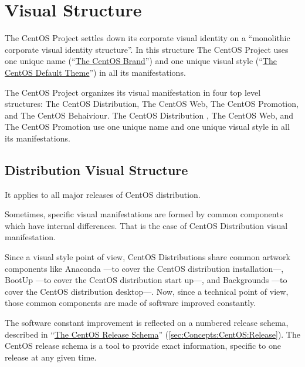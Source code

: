     \section{Visual Structure}
\hypertarget{sec:Concepts:Identity:Structure}{}
      \label{sec:Concepts:Identity:Structure}

The CentOS Project settles down its corporate visual identity on a
``monolithic corporate visual identity structure''. In this structure
The CentOS Project uses one unique name
(``\hyperlink{sec:Concepts:Identity:Brands}{The CentOS Brand}'') and
one unique visual style
(``\hyperlink{sec:Concepts:Identity:Themes:Default}{The CentOS Default
Theme}'') in all its manifestations. 

The CentOS Project organizes its visual manifestation in four top
level structures: The CentOS Distribution, The CentOS Web, The CentOS
Promotion, and The CentOS Behaiviour.  The CentOS Distribution , The
CentOS Web, and The CentOS Promotion use one unique name and one
unique visual style in all its manifestations.

 \subsection{Distribution Visual Structure}
\hypertarget{sec:Concepts:Identity:Structure:Distribution}{}
      \label{sec:Concepts:Identity:Structure:Distribution}

It applies to all major releases of CentOS distribution.

Sometimes, specific visual manifestations are formed by common
components which have internal differences. That is the case of CentOS
Distribution visual manifestation.  

Since a visual style point of view, CentOS Distributions share common
artwork components like Anaconda ---to cover the CentOS distribution
installation---, BootUp ---to cover the CentOS distribution start
up---, and Backgrounds ---to cover the CentOS distribution desktop---.
Now, since a technical point of view, those common components are made
of software improved constantly. 

The software constant improvement is reflected on a numbered release
schema, described in ``\hyperlink{sec:Concepts:CentOS:Release}{The
CentOS Release Schema}'' (\autoref{sec:Concepts:CentOS:Release}). The CentOS release schema is a tool to
provide exact information, specific to one release at any given time. 

